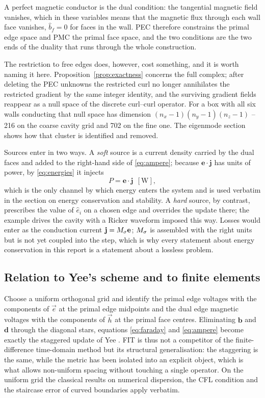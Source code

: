 A perfect magnetic conductor is the dual condition: the tangential magnetic field vanishes, which in these
variables means that the magnetic flux through each wall face vanishes, $\hat b_f = 0$ for faces in the wall. PEC
therefore constrains the primal edge space and PMC the primal face space, and the two conditions are the two ends
of the duality that runs through the whole construction.

The restriction to free edges does, however, cost something, and it is worth naming it here. Proposition~\ref{prop:exactness}
concerns the full complex; after deleting the PEC unknowns the restricted curl no longer annihilates the
restricted gradient by the same integer identity, and the surviving gradient fields reappear as a null space of
the discrete curl--curl operator. For a box with all six walls conducting that null space has dimension
$(n_x-1)(n_y-1)(n_z-1)$ -- 216 on the coarse cavity grid and 702 on the fine one. The eigenmode section shows how
that cluster is identified and removed.

Sources enter in two ways. A \emph{soft} source is a current density carried by the dual faces and added to the
right-hand side of \eqref{eq:ampere}; because $\mathbf{e}\cdot\mathbf{j}$ has units of power, by \eqref{eq:energies}
it injects
\begin{equation}
  P = \mathbf{e}\cdot\mathbf{j}\ \ [\mathrm{W}],
  \label{eq:power}
\end{equation}
which is the only channel by which energy enters the system and is used verbatim in the section on energy conservation and stability. A
\emph{hard} source, by contrast, prescribes the value of $\hat e_i$ on a chosen edge and overrides the update
there; the example drives the cavity with a Ricker waveform imposed this way. Losses would enter as the
conduction current $\mathbf{j} = {M_{\sigma}}\mathbf{e}$; ${M_{\sigma}}$ is assembled with the right units but is not yet coupled
into the step, which is why every statement about energy conservation in this report is a statement about a
lossless problem.

\subsection{Relation to Yee's scheme and to finite elements}

Choose a uniform orthogonal grid and identify the primal edge voltages with the components of $\vec e$ at the
primal edge midpoints and the dual edge magnetic voltages with the components of $\vec h$ at the primal face
centres. Eliminating $\mathbf{b}$ and $\mathbf{d}$ through the diagonal stars, equations \eqref{eq:faraday} and
\eqref{eq:ampere} become exactly the staggered update of Yee \cite{yee1966}. FIT is thus not a competitor of the
finite-difference time-domain method but its structural generalisation: the staggering is the same, while the
metric has been isolated into an explicit object, which is what allows non-uniform spacing without touching a
single operator. On the uniform grid the classical results on numerical dispersion, the CFL condition and the
staircase error of curved boundaries \cite{taflove2005} apply verbatim.

